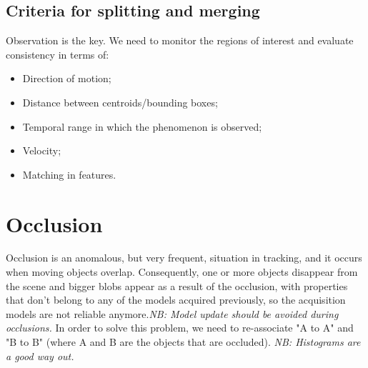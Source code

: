 \subsection{Criteria for splitting and merging}
Observation is the key. We need to monitor the regions of interest and evaluate consistency in terms of:
\begin{itemize}
    \item Direction of motion;
    \item Distance between centroids/bounding boxes;
    \item Temporal range in which the phenomenon is observed;
    \item Velocity;
    \item Matching in features.
\end{itemize}

\section{Occlusion}
Occlusion is an anomalous, but very frequent, situation in tracking, and it occurs when moving objects overlap.
Consequently, one or more objects disappear from the scene and bigger blobs appear as a result of the occlusion, with properties that don't belong to any of the models acquired previously, so the acquisition models are not reliable anymore.\textit{NB: Model update should be avoided during occlusions.}
In order to solve this problem, we need to re-associate "A to A" and "B to B" (where A and B are the objects that are occluded). \textit{NB: Histograms are a good way out.}


